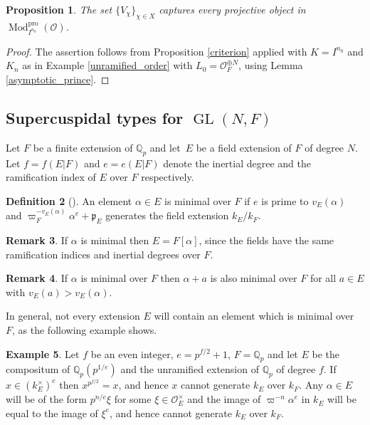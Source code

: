 \documentclass[JEP,XML,SOM,Unicode,NoEqCountersInSection]{cedram}
\let\mathcal\mathscr
\newtheorem{prop}{Proposition}[section]
\theoremstyle{definition}
\newtheorem{defi}[prop]{Definition}
\newtheorem{examp}[prop]{Example}
\newtheorem{remark}[prop]{Remark}
\DeclareMathOperator{\GL}{GL}
\DeclareMathOperator{\Mod}{Mod}
\newcommand{\Qp}{\mathbb {Q}_p}
\newcommand{\cO}{\mathcal{O}}
\newcommand{\pp}{\mathfrak p}
\newcommand{\pro}{\mathrm{pro}}
\begin{document}
\begin{prop} The set $\{ V_{\chi}\}_ {\chi\in X}$ captures every projective object in $\Mod^{\pro}_{I^{n_0}}(\cO)$.
\end{prop}

\begin{proof} The assertion follows from Proposition \ref{criterion} applied with $K=I^{n_0}$ and $K_n$ as in Example \ref{unramified_order} with $L_0= \cO_F^{\oplus N}$,
using Lemma \ref{asymptotic_prince}.
\end{proof}

\subsection{Supercuspidal types for $\GL(N, F)$}\label{sec_super}
Let $F$ be a finite extension of $\Qp$ and let~$E$ be a field extension of $F$ of degree $N$. Let $f=f(E|F)$ and $e=e(E|F)$ denote the inertial degree and the ramification
index of $E$ over $F$ respectively.

\begin{defi}[{\cite[(1.4.14)]{BK}}] An element $\alpha\in E$ is minimal over $F$ if $e$ is prime to $v_E(\alpha)$ and $\varpi_F^{-v_E(\alpha)} \alpha^e +\pp_E$ generates
the field extension $k_E/k_F$.
\end{defi}

\begin{remark} If $\alpha$ is minimal then $E=F[\alpha]$, since the fields have the same ramification indices and inertial degrees over $F$.
\end{remark}

\begin{remark} If $\alpha$ is minimal over $F$ then $\alpha +a$ is also minimal over $F$ for all $a\in E$ with $v_E(a)> v_E(\alpha)$.
\end{remark}

In general, not every extension $E$ will contain an element which is minimal over~$F$, as the following example shows.

\begin{examp} Let $f$ be an even integer, $e=p^{f/2}+1$, $F=\Qp$ and let $E$ be the compositum of $\Qp(p^{1/e})$ and the unramified extension
of $\Qp$ of degree $f$. If $x\in (k_E^{\times})^e$ then $x^{p^{f/2}}=x$, and hence $x$ cannot generate $k_E$ over $k_F$. Any $\alpha\in E$ will
be of the form $p^{n/e}\xi$ for some $\xi\in \cO_E^{\times}$ and the image of $\varpi^{-n} \alpha^e$ in $k_E$ will be equal to the image of $\xi^e$,
and hence cannot generate $k_E$ over $k_F$.
\end{examp}
\end{document}
